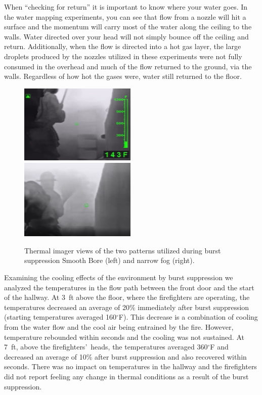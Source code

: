 \documentclass[12pt,oneside]{book}
\begin{document}
When ``checking for return'' it is important to know where your water goes.  In the water mapping experiments, you can see that flow from a nozzle will hit a surface and the momentum will carry most of the water along the ceiling to the walls.  Water directed over your head will not simply bounce off the ceiling and return.  Additionally, when the flow is directed into a hot gas layer, the large droplets produced by the nozzles utilized in these experiments were not fully consumed in the overhead and much of the flow returned to the ground, via the walls. Regardless of how hot the gases were, water still returned to the floor.

\begin{figure}[H]
\centering
\includegraphics[width=0.495\textwidth]{../0_Images/Tactical_Considerations/Burst_Suppression/Solid_Stream_Burst}
\includegraphics[width=0.495\textwidth]{../0_Images/Tactical_Considerations/Burst_Suppression/Fog_Burst}
\caption[Burst Suppression Example]{Thermal imager views of the two patterns utilized during burst suppression Smooth Bore (left) and narrow fog (right).}
\label{fig:tc_burst_supp_ir}
\end{figure}

Examining the cooling effects of the environment by burst suppression we analyzed the temperatures in the flow path between the front door and the start of the hallway.  At 3~ft above the floor, where the firefighters are operating, the temperatures decreased an average of 20\% immediately after burst suppression (starting temperatures averaged 160$^\circ$F).  This decrease is a combination of cooling from the water flow and the cool air being entrained by the fire.  However, temperature rebounded within seconds and the cooling was not sustained.  At 7~ft, above the firefighters\textquoteright \ heads, the temperatures averaged 360$^\circ$F and decreased an average of 10\% after burst suppression and also recovered within seconds.  There was no impact on temperatures in the hallway and the firefighters did not report feeling any change in thermal conditions as a result of the burst suppression.  
\end{document}
